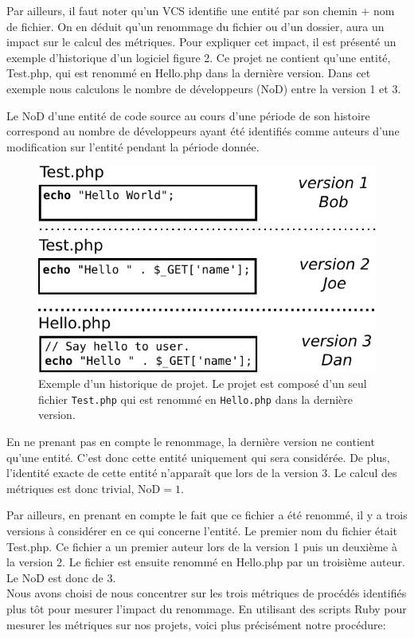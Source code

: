 Par ailleurs, il faut noter qu'un VCS identifie une entité par son chemin $+$ nom de fichier. On en déduit qu'un renommage du fichier ou d'un dossier, aura un impact sur le calcul des métriques. Pour expliquer cet impact, il est présenté un exemple d'historique d'un logiciel figure 2. Ce projet ne contient qu'une entité, Test.php, qui est renommé en Hello.php dans la dernière version. Dans cet exemple nous calculons le nombre de développeurs (NoD) entre la version 1 et 3.

Le NoD d'une entité de code source au cours d'une période de son histoire correspond au nombre de développeurs ayant été identifiés comme auteurs d'une modification sur l'entité pendant la période donnée.\\

\begin{figure}[t]
	\centering
	\includegraphics[width=0.8\linewidth,keepaspectratio]{data/figures/example.pdf}
	\caption{Exemple d'un historique de projet. Le projet est composé d'un seul fichier \texttt{Test.php} qui est renommé en \texttt{Hello.php} dans la dernière version.}
	\label{fig:example}
\end{figure}
En ne prenant pas en compte le renommage, la dernière version ne contient qu'une entité. C'est donc cette entité uniquement qui sera considérée. De plus, l'identité exacte de cette entité n'apparaît que lors de la version 3. Le calcul des métriques est donc trivial, NoD$ = 1$.

Par ailleurs, en prenant en compte le fait que ce fichier a été renommé, il y a trois versions à considérer en ce qui concerne l'entité. Le premier nom du fichier était Test.php. Ce fichier a un premier auteur lors de la version 1 puis un deuxième à la version 2. Le fichier est ensuite renommé en Hello.php par un troisième auteur. Le NoD est donc de 3.\\

Nous avons choisi de nous concentrer sur les trois métriques de procédés identifiés plus tôt pour mesurer l'impact du renommage. En utilisant des scripts Ruby pour mesurer les métriques sur nos projets, voici plus précisément notre procédure: 

